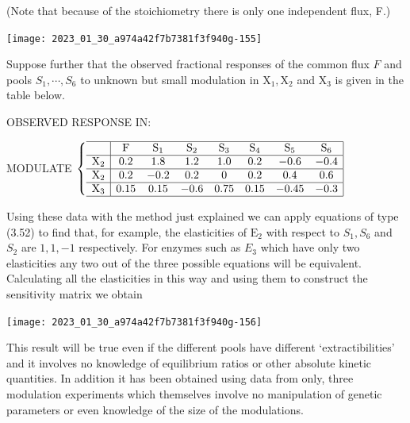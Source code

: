(Note that because of the stoichiometry there is only one independent flux, F.)

\begin{center}
\texttt{[image: 2023\_01\_30\_a974a42f7b7381f3f940g-155]}
\end{center}

Suppose further that the observed fractional responses of the common flux $F$ and pools $S_{1}, \cdots, S_{6}$ to unknown but small modulation in $\mathrm{X}_{1}, \mathrm{X}_{2}$ and $\mathrm{X}_{3}$ is given in the table below.

\vspace{6pt}
\centerline{OBSERVED RESPONSE IN:}
\vspace{6pt}

MODULATE $\left\{\begin{array}{c|ccccccc|}\hline & \mathrm{F} & \mathrm{S}_{1} & \mathrm{S}_{2} & \mathrm{S}_{3} & \mathrm{S}_{4} & \mathrm{S}_{5} & \mathrm{S}_{6} \\ \hline \mathrm{X}_{2} & 0.2 & 1.8 & 1.2 & 1.0 & 0.2 & -0.6 & -0.4 \\ \hline \mathrm{X}_{2} & 0.2 & -0.2 & 0.2 & 0 & 0.2 & 0.4 & 0.6 \\ \hline \mathrm{X}_{3} & 0.15 & 0.15 & -0.6 & 0.75 & 0.15 & -0.45 & -0.3 \\ \hline\end{array}\right.$

\medskip
Using these data with the method just explained we can apply equations of type (3.52) to find that, for example, the elasticities of $\mathrm{E}_{2}$ with respect to $S_{1}, S_{6}$ and $S_{2}$ are $1, 1,-1$ respectively. For enzymes such as $E_{3}$ which have only two elasticities any two out of the three possible equations will be equivalent. Calculating all the elasticities in this way and using them to construct the sensitivity matrix we obtain

\begin{center}
\texttt{[image: 2023\_01\_30\_a974a42f7b7381f3f940g-156]}
\end{center}

This result will be true even if the different pools have different `extractibilities' and it involves no knowledge of equilibrium ratios or other absolute kinetic quantities. In addition it has been obtained using data from only, three modulation experiments which themselves involve no manipulation of genetic parameters or even knowledge of the size of the modulations.

